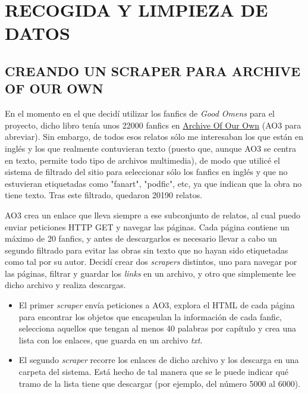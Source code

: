 \documentclass{pre-tfg}
\begin{document}
\section{RECOGIDA Y LIMPIEZA DE DATOS}

\subsection{CREANDO UN SCRAPER PARA ARCHIVE OF OUR OWN}
\label{sec:recogidadatos}

En el momento en el que decidí utilizar los fanfics de \textit{Good Omens} para el proyecto, dicho libro tenía unos 22000 fanfics en \href{archiveofourown.org}{Archive Of Our Own} (AO3 para abreviar). Sin embargo, de todos esos relatos sólo me interesaban los que están en inglés y los que realmente contuvieran texto (puesto que, aunque AO3 se centra en texto, permite todo tipo de archivos multimedia), de modo que utilicé el sistema de filtrado del sitio para seleccionar sólo los fanfics en inglés y que no estuvieran etiquetadas como "fanart", "podfic", etc, ya que indican que la obra no tiene texto. Tras este filtrado, quedaron 20190 relatos. 

AO3 crea un enlace que lleva siempre a ese subconjunto de relatos, al cual puedo enviar peticiones HTTP GET y navegar las páginas. Cada página contiene un máximo de 20 fanfics, y antes de descargarlos es necesario llevar a cabo un segundo filtrado para evitar las obras sin texto que no hayan sido etiquetadas como tal por su autor. Decidí crear dos \textit{scrapers} distintos, uno para navegar por las páginas, filtrar y guardar los \textit{links} en un archivo, y otro que simplemente lee dicho archivo y realiza descargas.

\begin{itemize}
	\item El primer \textit{scraper} envía peticiones a AO3, explora el HTML de cada página para encontrar los objetos que encapsulan la información de cada fanfic, selecciona aquellos que tengan al menos 40 palabras por capítulo y crea una lista con los enlaces, que guarda en un archivo \textit{txt}.
	\item El segundo \textit{scraper} recorre los enlaces de dicho archivo y los descarga en una carpeta del sistema. Está hecho de tal manera que se le puede indicar qué tramo de la lista tiene que descargar (por ejemplo, del número 5000 al 6000).
	
\end{itemize}
\end{document}
